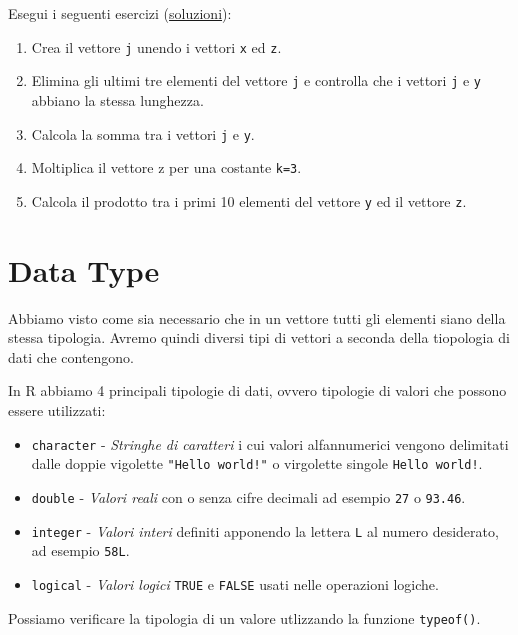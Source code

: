 \documentclass[
]{book}
\providecommand{\tightlist}{%
  \setlength{\itemsep}{0pt}\setlength{\parskip}{0pt}}
\begin{document}
Esegui i seguenti esercizi (\href{https://github.com/psicostat/Introduction2R/blob/master/exercises/chapter-07.R}{soluzioni}):

\begin{enumerate}
\def\labelenumi{\arabic{enumi}.}
\tightlist
\item
  Crea il vettore \texttt{j} unendo i vettori \texttt{x} ed \texttt{z}.
\item
  Elimina gli ultimi tre elementi del vettore \texttt{j} e controlla che i vettori \texttt{j} e \texttt{y} abbiano la stessa lunghezza.
\item
  Calcola la somma tra i vettori \texttt{j} e \texttt{y}.
\item
  Moltiplica il vettore z per una costante \texttt{k=3}.
\item
  Calcola il prodotto tra i primi 10 elementi del vettore \texttt{y} ed il vettore \texttt{z}.
\end{enumerate}

\hypertarget{data-type}{%
\section{Data Type}\label{data-type}}

Abbiamo visto come sia necessario che in un vettore tutti gli elementi siano della stessa tipologia. Avremo quindi diversi tipi di vettori a seconda della tiopologia di dati che contengono.

In R abbiamo 4 principali tipologie di dati, ovvero tipologie di valori che possono essere utilizzati:

\begin{itemize}
\tightlist
\item
  \texttt{character} - \emph{Stringhe di caratteri} i cui valori alfannumerici vengono delimitati dalle doppie vigolette \texttt{"Hello\ world!"} o virgolette singole \texttt{\textquotesingle{}Hello\ world!\textquotesingle{}}.
\item
  \texttt{double} - \emph{Valori reali} con o senza cifre decimali ad esempio \texttt{27} o \texttt{93.46}.
\item
  \texttt{integer} - \emph{Valori interi} definiti apponendo la lettera \texttt{L} al numero desiderato, ad esempio \texttt{58L}.
\item
  \texttt{logical} - \emph{Valori logici} \texttt{TRUE} e \texttt{FALSE} usati nelle operazioni logiche.
\end{itemize}

Possiamo verificare la tipologia di un valore utlizzando la funzione \texttt{typeof()}.
\end{document}
